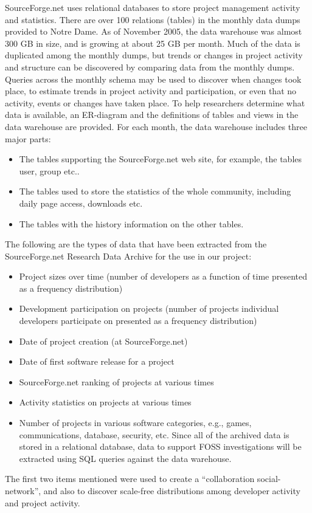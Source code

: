SourceForge.net uses relational databases to store project management activity and statistics. There are over
100 relations (tables) in the monthly data dumps provided to Notre Dame. As of November 2005, the data warehouse was
almost 300 GB in size, and is growing at about 25 GB per month. Much of the data is duplicated among the monthly dumps,
but trends or changes in project activity and structure can be discovered by comparing data from the monthly dumps.
Queries across the monthly schema may be used to discover when changes took place, to estimate trends in project
activity and participation, or even that no activity, events or changes have taken place. To help researchers
determine what data is available, an ER-diagram and the definitions of tables and views in the data warehouse are provided.
For each month, the data warehouse includes three major parts:
\begin{itemize}
\item The tables supporting the SourceForge.net web site, for example, the tables user, group etc..
\item The tables used to store the statistics of the whole community, including daily page access, downloads etc.
\item The tables with the history information on the other tables.
\end{itemize}


The following are the types of data that have been extracted from the SourceForge.net Research Data Archive for
the use in our project:
\begin{itemize}
\item Project sizes over time (number of developers as a function of time presented as a frequency distribution)
\item Development participation on projects (number of projects individual developers participate on presented as a frequency distribution)
\item Date of project creation (at SourceForge.net)
\item Date of first software release for a project
\item SourceForge.net ranking of projects at various times
\item Activity statistics on projects at various times
\item Number of projects in various software categories, e.g., games, communications, database, security, etc. Since all of the archived data is stored in a relational database, data to support FOSS investigations will be extracted using SQL queries against the data warehouse.
\end{itemize}
The first two items mentioned were used to create a ``collaboration social-network”, and also
to discover scale-free distributions among developer activity and project activity.

